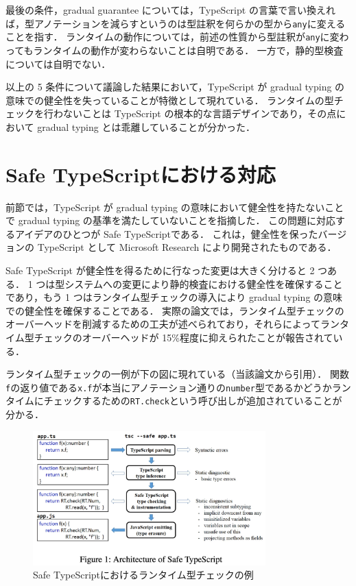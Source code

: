最後の条件，gradual guarantee については，TypeScript の言葉で言い換えれば，型アノテーションを減らすというのは型註釈を何らかの型から\texttt{any}に変えることを指す．
ランタイムの動作については，前述の性質から型註釈が\texttt{any}に変わってもランタイムの動作が変わらないことは自明である．
一方で，静的型検査については自明でない．

以上の 5 条件について議論した結果において，TypeScript が gradual typing の意味での健全性を失っていることが特徴として現れている．
ランタイムの型チェックを行わないことは TypeScript の根本的な言語デザインであり，その点において gradual typing とは乖離していることが分かった．

\section{Safe TypeScriptにおける対応}

前節では，TypeScript が gradual typing の意味において健全性を持たないことで gradual typing の基準を満たしていないことを指摘した．
この問題に対応するアイデアのひとつが Safe TypeScript\cite{rastogi2015safe}である．
これは，健全性を保ったバージョンの TypeScript として Microsoft Research により開発されたものである．

Safe TypeScript が健全性を得るために行なった変更は大きく分けると 2 つある．
1 つは型システムへの変更により静的検査における健全性を確保することであり，もう 1 つはランタイム型チェックの導入により gradual typing の意味での健全性を確保することである．
実際の論文では，ランタイム型チェックのオーバーヘッドを削減するための工夫が述べられており，それらによってランタイム型チェックのオーバーヘッドが 15\%程度に抑えられたことが報告されている．

ランタイム型チェックの一例が下の図に現れている（当該論文\cite{rastogi2015safe}から引用）．
関数\texttt{f}の返り値である\texttt{x.f}が本当にアノテーション通りの\texttt{number}型であるかどうかランタイムにチェックするための\texttt{RT.check}という呼び出しが追加されていることが分かる．

\begin{figure}[H]
    \centering
    \includegraphics[width=0.8\textwidth]{figures/fig_overview_safe_typescript.png}
    \caption{Safe TypeScriptにおけるランタイム型チェックの例}
\end{figure}

